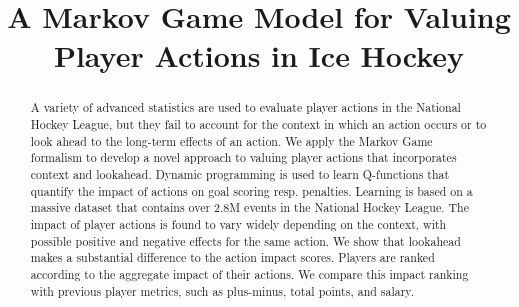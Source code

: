 \documentclass[]{article}
\title{A Markov Game Model for Valuing Player Actions in Ice Hockey}
\author{} %
\begin{document}
\maketitle

\begin{abstract}
A variety of advanced statistics are used to evaluate player actions in the National Hockey League, but they fail to account for the context in which an action occurs or to look ahead to the long-term effects of an action. We apply the Markov Game formalism to develop a novel approach to valuing player actions that incorporates context and lookahead. Dynamic programming is used to learn Q-functions that quantify the impact of actions on goal scoring resp. penalties. Learning is based on a massive dataset that contains over 2.8M events in the National Hockey League.
The impact of player actions is found to vary widely depending on the context, with possible positive and negative effects for the same action. We show that lookahead makes a substantial difference to the action impact scores.
Players are ranked according to the aggregate impact of their actions. We compare this impact ranking with previous player metrics, such as plus-minus, total points, and salary.
\end{abstract}


\end{document}
